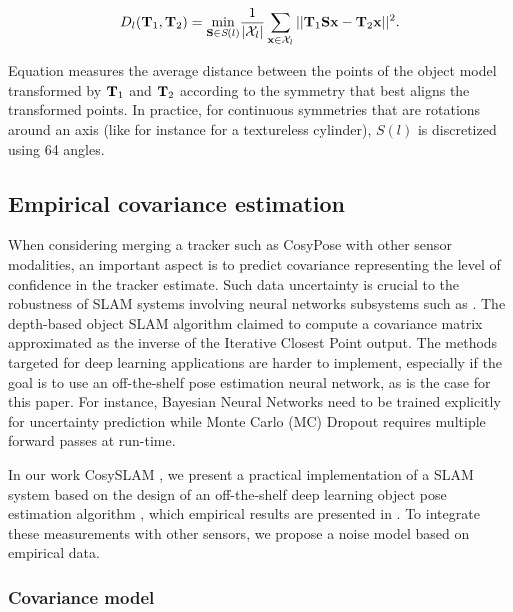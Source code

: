 \begin{equation}
    D_l({\bf T}_1, {\bf T}_2) = \underset{{\bf S} \in \textit{S}(l)}{\text{min}} \frac{1}{|\mathcal{X}_l|} \sum_{\mathbf{x} \in \mathcal{X}_l} ||{\bf T}_1 {\bf S} \mathbf{x} - {\bf T}_2\mathbf{x} ||^2.
    \label{eq:distSym}
\end{equation}

Equation  measures the average distance between the points of the object model transformed by ${\bf T}_1$ and ${\bf T}_2$ according to the symmetry 
that best aligns the transformed points. In practice, for continuous symmetries  that are rotations around an axis (like for instance for a textureless cylinder), 
$S(l)$ is discretized using 64 angles.


\subsection{Empirical covariance estimation}
\label{sec:cosypose_covariance}

When considering merging a tracker such as CosyPose with other sensor modalities, an important aspect is to predict covariance representing the level 
of confidence in the tracker estimate. Such data uncertainty is crucial to the robustness of SLAM systems involving neural networks 
subsystems such as \cite{yang2020d3vo}. The depth-based object SLAM algorithm \cite{SalasMoreno2013SLAMSL} claimed to compute a covariance matrix approximated 
as the inverse of the Iterative Closest Point output. The methods targeted for deep learning applications are harder to implement, especially if the goal 
is to use an off-the-shelf pose estimation neural network, as is the case for this paper. For instance, Bayesian Neural Networks \cite{jospin2020hands} 
need to be trained explicitly for uncertainty prediction while Monte Carlo (MC) Dropout \cite{gal2016dropout} requires multiple forward passes at run-time.

In our work CosySLAM \cite{debeunne2021cosyslam}, we present a practical implementation of a SLAM system based on the design of an off-the-shelf deep learning object 
pose estimation algorithm \cite{labbe2020cosypose}, which empirical results are presented in . 
To integrate these measurements with other sensors, we propose a noise model based on empirical data.

\subsubsection{Covariance model}

